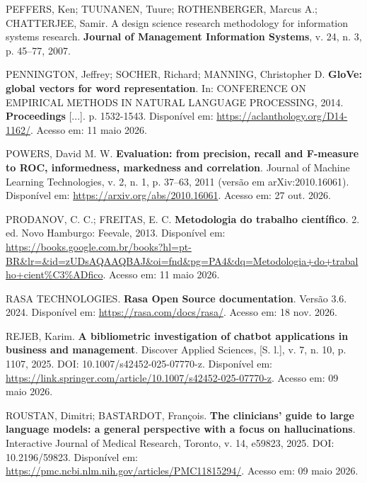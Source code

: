 \documentclass[12pt,a4paper]{extarticle}
\begin{document}
\vspace{0.5cm}\noindent
PEFFERS, Ken; TUUNANEN, Tuure; ROTHENBERGER, Marcus A.; CHATTERJEE, Samir. A design science research methodology for information systems research. \textbf{Journal of Management Information Systems}, v. 24, n. 3, p. 45--77, 2007.

\vspace{0.5cm}\noindent
PENNINGTON, Jeffrey; SOCHER, Richard; MANNING, Christopher D. \textbf{GloVe: global vectors for word representation}. In: CONFERENCE ON EMPIRICAL METHODS IN NATURAL LANGUAGE PROCESSING, 2014. \textbf{Proceedings} [...]. p. 1532-1543. Disponível em: \url{https://aclanthology.org/D14-1162/}. Acesso em: 11 maio 2026.

\vspace{0.5cm}\noindent
POWERS, David M. W. \textbf{Evaluation: from precision, recall and F-measure to ROC, informedness, markedness and correlation}. Journal of Machine Learning Technologies, v. 2, n. 1, p. 37--63, 2011 (versão em arXiv:2010.16061). Disponível em: \url{https://arxiv.org/abs/2010.16061}. Acesso em: 27 out. 2026.

\vspace{0.5cm}\noindent
PRODANOV, C. C.; FREITAS, E. C. \textbf{Metodologia do trabalho científico}. 2. ed. Novo Hamburgo: Feevale, 2013. Disponível em: \url{https://books.google.com.br/books?hl=pt-BR&lr=&id=zUDsAQAAQBAJ&oi=fnd&pg=PA4&dq=Metodologia+do+trabalho+cient%C3%ADfico}. Acesso em: 11 maio 2026.

\vspace{0.5cm}\noindent
RASA TECHNOLOGIES. \textbf{Rasa Open Source documentation}. Versão 3.6. 2024. Disponível em: \url{https://rasa.com/docs/rasa/}. Acesso em: 18 nov. 2026.

\vspace{0.5cm}\noindent
REJEB, Karim. \textbf{A bibliometric investigation of chatbot applications in business and management}. Discover Applied Sciences, [S. l.], v. 7, n. 10, p. 1107, 2025. DOI: 10.1007/s42452-025-07770-z. Disponível em: \url{https://link.springer.com/article/10.1007/s42452-025-07770-z}. Acesso em: 09 maio 2026.

\vspace{0.5cm}\noindent
ROUSTAN, Dimitri; BASTARDOT, François. \textbf{The clinicians' guide to large language models: a general perspective with a focus on hallucinations}. Interactive Journal of Medical Research, Toronto, v. 14, e59823, 2025. DOI: 10.2196/59823. Disponível em: \url{https://pmc.ncbi.nlm.nih.gov/articles/PMC11815294/}. Acesso em: 09 maio 2026.
\end{document}
